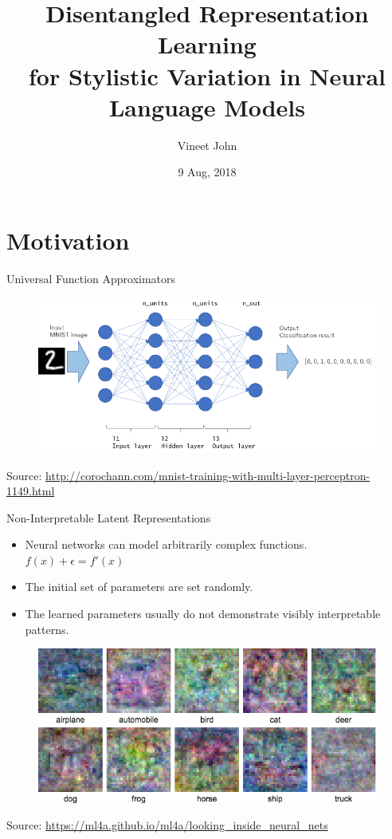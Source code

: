 \documentclass[aspectratio=169]{beamer}
\title{
	Disentangled Representation Learning\\
	for Stylistic Variation in Neural Language Models}
\date{9 Aug, 2018}
\author{Vineet John}
\institute{University of Waterloo}
\newcommand{\imgsrc}[1]{\tiny{Source: #1}}
\begin{document}
\maketitle
\graphicspath{{images/}}

\section{Motivation}

\begin{frame}{Universal Function Approximators}
	\centering
	\begin{figure}[ht]
		\includegraphics[width=\linewidth]{mlp-network}
	\end{figure}
	\imgsrc{\url{http://corochann.com/mnist-training-with-multi-layer-perceptron-1149.html}}
\end{frame}

\begin{frame}{Non-Interpretable Latent Representations}
	\begin{itemize}
		\item Neural networks can model arbitrarily complex functions. $f(x) + \epsilon = f'(x)$
		\item The initial set of parameters are set randomly.
		\item The learned parameters usually do not demonstrate visibly interpretable patterns.
	\end{itemize}

	\centering
	\begin{figure}[ht]
		\includegraphics[width=0.5\linewidth]{uninterpretable-weights}
	\end{figure}
	\imgsrc{\url{https://ml4a.github.io/ml4a/looking_inside_neural_nets}}
\end{frame}
\end{document}
